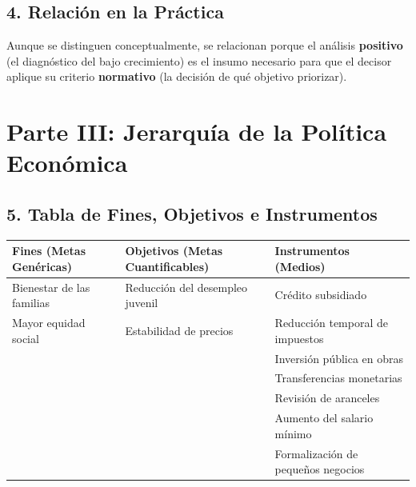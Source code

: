 \documentclass[12pt,spanish]{article}
\newcounter{none}
\begin{document}
\subsection{4. Relación en la
Práctica}\label{relaciuxf3n-en-la-pruxe1ctica}

Aunque se distinguen conceptualmente, se relacionan porque el análisis
\textbf{positivo} (el diagnóstico del bajo crecimiento) es el insumo
necesario para que el decisor aplique su criterio \textbf{normativo} (la
decisión de qué objetivo priorizar).

\section{Parte III: Jerarquía de la Política
Económica}\label{parte-iii-jerarquuxeda-de-la-poluxedtica-econuxf3mica}

\subsection{5. Tabla de Fines, Objetivos e
Instrumentos}\label{tabla-de-fines-objetivos-e-instrumentos}

{\def\LTcaptype{none} %
\begin{longtable}[]{@{}
  >{\raggedright\arraybackslash}p{}
  >{\raggedright\arraybackslash}p{}
  >{\raggedright\arraybackslash}p{}@{}}
\toprule\noalign{}
\begin{minipage}[b]{\linewidth}\raggedright
Fines (Metas Genéricas)
\end{minipage} & \begin{minipage}[b]{\linewidth}\raggedright
Objetivos (Metas Cuantificables)
\end{minipage} & \begin{minipage}[b]{\linewidth}\raggedright
Instrumentos (Medios)
\end{minipage} \\
\midrule\noalign{}
\endhead
\bottomrule\noalign{}
\endlastfoot
Bienestar de las familias & Reducción del desempleo juvenil & Crédito
subsidiado \\
Mayor equidad social & Estabilidad de precios & Reducción temporal de
impuestos \\
& & Inversión pública en obras \\
& & Transferencias monetarias \\
& & Revisión de aranceles \\
& & Aumento del salario mínimo \\
& & Formalización de pequeños negocios \\
\end{longtable}
}
\end{document}
